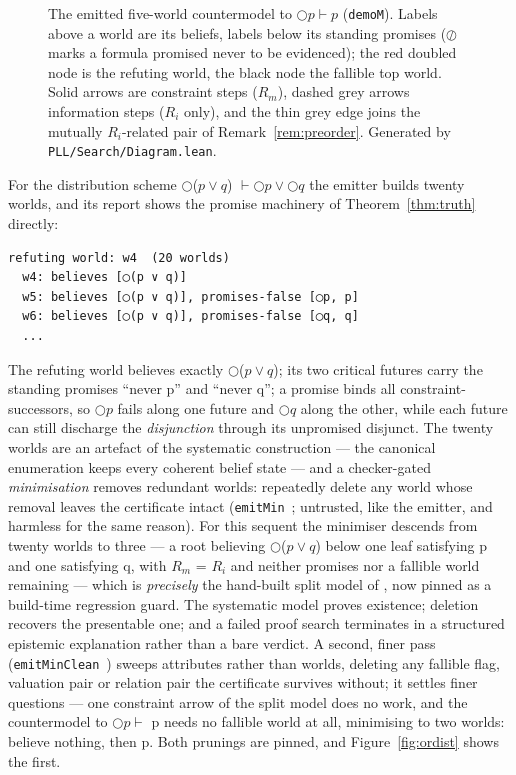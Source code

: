 \begin{figure}
\centering

\caption{The emitted five-world countermodel to
\ensuremath{\bigcirc p \vdash p} (\texttt{demoM}). Labels above a world
are its beliefs, labels below its standing promises
(\ensuremath{\oslash} marks a formula promised never to be evidenced);
the red doubled node is the refuting world, the black node the fallible
top world. Solid arrows are constraint steps (\ensuremath{R_{m}}), dashed
grey arrows information steps (\ensuremath{R_{i}} only), and the thin
grey edge joins the mutually \ensuremath{R_{i}}-related pair of
Remark~\ref{rem:preorder}. Generated by \texttt{PLL/\allowbreak{}Search/\allowbreak{}Diagram.lean}.}
\label{fig:demoM}
\end{figure}

For the distribution scheme \ensuremath{\bigcirc}(\ensuremath{p \vee q}) \ensuremath{\vdash \bigcirc p \vee \bigcirc q} the emitter builds
twenty worlds, and its report shows the promise machinery of
Theorem~\ref{thm:truth} directly:

\begin{lstlisting}
refuting world: w4  (20 worlds)
  w4: believes [◯(p ∨ q)]
  w5: believes [◯(p ∨ q)], promises-false [◯p, p]
  w6: believes [◯(p ∨ q)], promises-false [◯q, q]
  ...
\end{lstlisting}

The refuting world believes exactly \ensuremath{\bigcirc}(\ensuremath{p \vee q}); its two critical futures
carry the standing promises ``never p'' and ``never q''; a promise binds
all constraint-successors, so \ensuremath{\bigcirc p} fails along one future and \ensuremath{\bigcirc q} along the
other, while each future can still discharge the \emph{disjunction} through
its unpromised disjunct. The twenty worlds are an artefact of the
systematic construction --- the canonical enumeration keeps every
coherent belief state --- and a checker-gated \emph{minimisation} removes redundant
worlds: repeatedly delete any world whose removal leaves the
certificate intact (\texttt{emitMin}~; untrusted, like the emitter, and
harmless for the same reason). For this sequent the minimiser descends
from twenty worlds to three --- a root believing \ensuremath{\bigcirc}(\ensuremath{p \vee q}) below one leaf
satisfying p and one satisfying q, with \ensuremath{R_{m}} = \ensuremath{R_{i}} and neither promises
nor a fallible world remaining --- which is \emph{precisely} the hand-built
split model of \cite[Fig.~3]{FairtloughMendler1997}, now pinned as a build-time
regression guard. The systematic model proves existence; deletion
recovers the presentable one; and a failed proof search terminates in
a structured epistemic explanation rather than a bare verdict. A
second, finer pass (\texttt{emitMinClean}~) sweeps attributes rather than
worlds, deleting any fallible flag, valuation pair or relation pair the
certificate survives without; it settles finer questions --- one constraint arrow of the split model does no work,
and the countermodel to \ensuremath{\bigcirc p \vdash} p needs no fallible world at all,
minimising to two worlds: believe nothing, then p. Both prunings are
pinned, and Figure~\ref{fig:ordist} shows the first.

